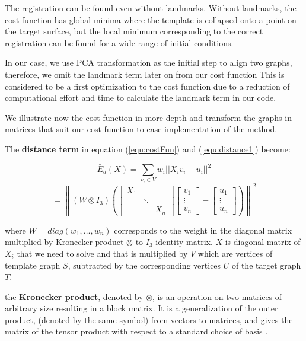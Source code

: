 \documentclass[../structure.tex]{subfiles}
\begin{document}
The registration can be found even without landmarks. Without landmarks, the cost function has global minima where the template is collapsed onto a point on the target surface, but the local minimum corresponding to the correct registration can be found for a wide range of initial conditions.

In our case, we use PCA transformation as the initial step to align two graphs, therefore, we omit the landmark term later on from our cost function This is considered to be a first optimization to the cost function due to a reduction of computational  effort and time to calculate the landmark term in our code.

We illustrate now the cost function in more depth and transform the graphs in matrices that suit our cost function to ease implementation of the method.

The \textbf{distance term} in equation (\ref{equ:costFun}) and (\ref{equ:distance1}) become:

\begin{equation}
\bar{E}_{d}(X) = \sum_{v_{i}\in V} w_{i}||X_{i}v_{i}-u_{i}||^2
\label{equ:distance2}
\end{equation}
\begin{equation*}
= \left\|(W \otimes I_{3}) \left(
\begin{bmatrix}
X_{1} & & \\
& \ddots & \\
& & X_{n}
\end{bmatrix}
\begin{bmatrix}
v_{1} \\ \vdots \\ v_{n}
\end{bmatrix} -
\begin{bmatrix}
u_{1}\\ \vdots \\ u_{n}
\end{bmatrix}
\right) \right\|^2
\end{equation*}

where $W = diag(w_{1},\dots, w_{n})$ corresponds to the weight in the diagonal matrix multiplied by Kronecker product $\otimes$ to $I_{3}$ identity matrix. $X$ is diagonal matrix of $X_{i}$ that we need to solve and that is multiplied by $V$ which are vertices of template graph $S$, subtracted by the corresponding vertices $U$ of the target graph $T$.

the \textbf{Kronecker product}, denoted by $\otimes$, is an operation on two matrices of arbitrary size resulting in a block matrix. It is a generalization of the outer product, (denoted by the same symbol) from vectors to matrices, and gives the matrix of the tensor product with respect to a standard choice of basis \cite{Wikipedia2019}.
\end{document}
